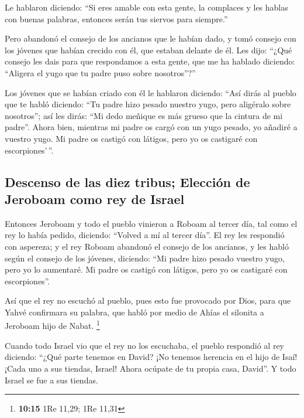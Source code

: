 \begin{paracol}{2}
 Le hablaron diciendo: ``Si eres amable con esta gente, la
complaces y les hablas con buenas palabras, entonces serán tus siervos
para siempre.''

 Pero abandonó el consejo de los ancianos que le habían
dado, y tomó consejo con los jóvenes que habían crecido con él, que
estaban delante de él.  Les dijo: ``¿Qué consejo les dais
para que respondamos a esta gente, que me ha hablado diciendo: ``Aligera
el yugo que tu padre puso sobre nosotros''?''

 Los jóvenes que se habían criado con él le hablaron
diciendo: ``Así dirás al pueblo que te habló diciendo: ``Tu padre hizo
pesado nuestro yugo, pero aligéralo sobre nosotros''; así les dirás:
``Mi dedo meñique es más grueso que la cintura de mi padre''.
 Ahora bien, mientras mi padre os cargó con un yugo
pesado, yo añadiré a vuestro yugo. Mi padre os castigó con látigos, pero
yo os castigaré con escorpiones'\,''.

\hypertarget{descenso-de-las-diez-tribus-elecciuxf3n-de-jeroboam-como-rey-de-israel}{%
\subsection{Descenso de las diez tribus; Elección de Jeroboam como rey
de
Israel}\label{descenso-de-las-diez-tribus-elecciuxf3n-de-jeroboam-como-rey-de-israel}}

 Entonces Jeroboam y todo el pueblo vinieron a Roboam al
tercer día, tal como el rey lo había pedido, diciendo: ``Volved a mí al
tercer día''.  El rey les respondió con aspereza; y el
rey Roboam abandonó el consejo de los ancianos,  y les
habló según el consejo de los jóvenes, diciendo: ``Mi padre hizo pesado
vuestro yugo, pero yo lo aumentaré. Mi padre os castigó con látigos,
pero yo os castigaré con escorpiones''.

 Así que el rey no escuchó al pueblo, pues esto fue
provocado por Dios, para que Yahvé confirmara su palabra, que habló por
medio de Ahías el silonita a Jeroboam hijo de Nabat. \footnote{\textbf{10:15}
  1Re 11,29; 1Re 11,31}

 Cuando todo Israel vio que el rey no los escuchaba, el
pueblo respondió al rey diciendo: ``¿Qué parte tenemos en David? ¡No
tenemos herencia en el hijo de Isaí! ¡Cada uno a sus tiendas, Israel!
Ahora ocúpate de tu propia casa, David''. Y todo Israel se fue a sus
tiendas.


\end{paracol}
